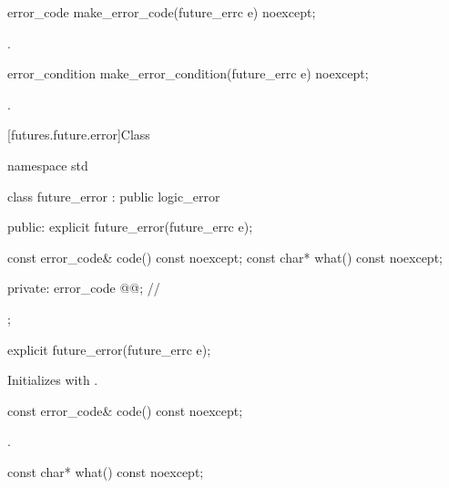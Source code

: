 %
\begin{itemdecl}
error_code make_error_code(future_errc e) noexcept;
\end{itemdecl}

\begin{itemdescr}
\pnum
\returns
{}.
\end{itemdescr}

%
\begin{itemdecl}
error_condition make_error_condition(future_errc e) noexcept;
\end{itemdecl}

\begin{itemdescr}
\pnum
\returns
{}.
\end{itemdescr}

[futures.future.error]{Class }

%
\begin{codeblock}
namespace std {
  class future_error : public logic_error {
  public:
    explicit future_error(future_errc e);

    const error_code& code() const noexcept;
    const char*       what() const noexcept;

  private:
    error_code @@;             // \expos
  };
}
\end{codeblock}

%
\begin{itemdecl}
explicit future_error(future_errc e);
\end{itemdecl}

\begin{itemdescr}
\pnum
\effects
Initializes  with .
\end{itemdescr}

%
\begin{itemdecl}
const error_code& code() const noexcept;
\end{itemdecl}

\begin{itemdescr}
\pnum
\returns
{}.
\end{itemdescr}

%
\begin{itemdecl}
const char* what() const noexcept;
\end{itemdecl}


